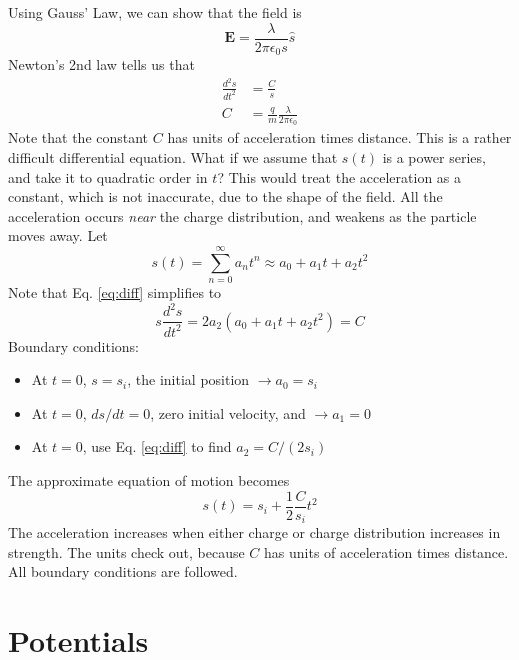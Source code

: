 \documentclass[10pt]{article}
\begin{document}
\begin{enumerate}
Using Gauss' Law, we can show that the field is
\begin{equation}
\mathbf{E} = \frac{\lambda}{2\pi\epsilon_0 s}\hat{s}
\end{equation}
Newton's 2nd law tells us that
\begin{align}
\frac{d^2 s}{dt^2} &= \frac{C}{s} \label{eq:diff} \\
C &= \frac{q}{m}\frac{\lambda}{2\pi\epsilon_0}
\end{align}
Note that the constant $C$ has units of acceleration times distance.  This is a rather difficult differential equation.  What if we assume that $s(t)$ is a power series, and take it to quadratic order in $t$?  This would treat the acceleration as a constant, which is not inaccurate, due to the shape of the field.  All the acceleration occurs \textit{near} the charge distribution, and weakens as the particle moves away.  Let
\begin{equation}
s(t) = \sum_{n = 0}^{\infty} a_n t^n \approx a_0 + a_1 t + a_2 t^2
\end{equation}
Note that Eq. \ref{eq:diff} simplifies to
\begin{equation}
s \frac{d^2 s}{dt^2} = 2 a_2 (a_0 + a_1 t + a_2 t^2) = C
\end{equation}
Boundary conditions:
\begin{itemize}
\item At $t=0$, $s = s_i$, the initial position $\rightarrow a_0 = s_i$
\item At $t = 0$, $ds/dt = 0$, zero initial velocity, and $\rightarrow a_1 = 0$
\item At $t = 0$, use Eq. \ref{eq:diff} to find $a_2 = C/(2 s_i)$
\end{itemize}
The approximate equation of motion becomes
\begin{equation}
s(t) = s_i + \frac{1}{2}\frac{C}{s_i}t^2
\end{equation}
The acceleration increases when either charge or charge distribution increases in strength.  The units check out, because $C$ has units of acceleration times distance.  All boundary conditions are followed.
\end{enumerate}

\section{Potentials}
\end{document}
